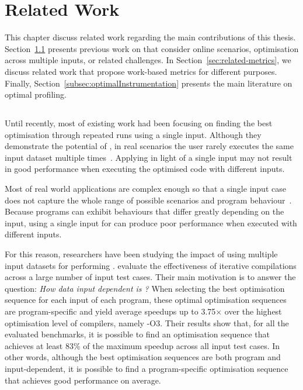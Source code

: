 \chapter{Related Work}\label{chap:related}

This chapter discuss related work regarding the main contributions of this thesis.
Section~\ref{sec:related-ic} presents previous work on {\itercomp} that consider online scenarios, optimisation across multiple inputs, or related challenges.
In Section~\ref{sec:related-metrics}, we discuss related work that propose work-based metrics for different purposes.
Finally, Section~\ref{subsec:optimalInstrumentation} presents the main literature on optimal profiling.


\section{{\IterComp}}\label{sec:related-ic}

Until recently, most of existing work  had been focusing on finding the best optimisation through repeated runs using a single input.
Although they demonstrate the potential of {\itercomp}, in real scenarios the user rarely executes the same input dataset multiple times~\citep{bodin98,kisuki99,stephenson03,kulkarni04,agakov06}.
Applying {\itercomp} in light of a single input may not result in good performance when executing the optimised code with different inputs.

Most of real world applications are complex enough so that a single input case does not capture the whole range of possible scenarios and program behaviour~\citep{haneda06,fursin07,chen10,chen12a}.
Because programs can exhibit behaviours that differ greatly depending on the input, using a single input for {\itercomp} can produce poor performance when executed with different inputs.

For this reason, researchers have been studying the impact of using multiple input datasets for performing {\itercomp}.
\cite{chen10,chen12a} evaluate the effectiveness of iterative compilations across a large number of input test cases.
Their main motivation is to answer the question:
\textit{How data input dependent is {\itercomp}?}
When selecting the best optimisation sequence for each input of each program, these optimal optimisation sequences are program-specific and yield average speedups up to 3.75$\times$ over the highest optimisation level of compilers, namely {\flagstype -O3}.
Their results show that, for all the evaluated benchmarks, it is possible to find an optimisation sequence that achieves at least 83\% of the maximum speedup across all input test cases.
In other words, although the best optimisation sequences are both program and input-dependent, it is possible to find a program-specific optimisation sequence that achieves good performance on average.

